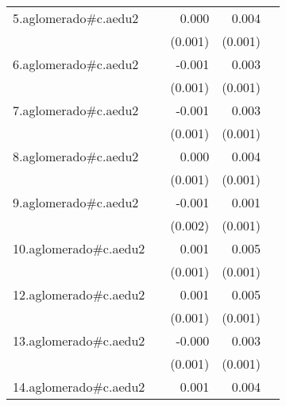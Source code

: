 {\begin{longtable}{l*{4}{D{.}{.}{-1}}}
\addlinespace
5.aglomerado#c.aedu2&                     &       0.000         &       0.004\sym{***}&                     \\
            &                     &     (0.001)         &     (0.001)         &                     \\
\addlinespace
6.aglomerado#c.aedu2&                     &      -0.001         &       0.003\sym{**} &                     \\
            &                     &     (0.001)         &     (0.001)         &                     \\
\addlinespace
7.aglomerado#c.aedu2&                     &      -0.001         &       0.003\sym{***}&                     \\
            &                     &     (0.001)         &     (0.001)         &                     \\
\addlinespace
8.aglomerado#c.aedu2&                     &       0.000         &       0.004\sym{***}&                     \\
            &                     &     (0.001)         &     (0.001)         &                     \\
\addlinespace
9.aglomerado#c.aedu2&                     &      -0.001         &       0.001         &                     \\
            &                     &     (0.002)         &     (0.001)         &                     \\
\addlinespace
10.aglomerado#c.aedu2&                     &       0.001         &       0.005\sym{***}&                     \\
            &                     &     (0.001)         &     (0.001)         &                     \\
\addlinespace
12.aglomerado#c.aedu2&                     &       0.001         &       0.005\sym{***}&                     \\
            &                     &     (0.001)         &     (0.001)         &                     \\
\addlinespace
13.aglomerado#c.aedu2&                     &      -0.000         &       0.003\sym{***}&                     \\
            &                     &     (0.001)         &     (0.001)         &                     \\
\addlinespace
14.aglomerado#c.aedu2&                     &       0.001         &       0.004\sym{***}&                     \\

\end{longtable}}
